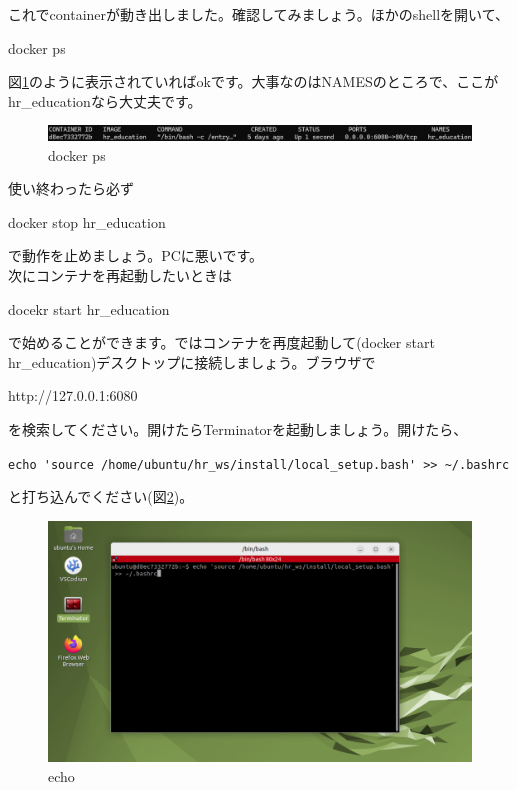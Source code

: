 \documentclass[a4paper,10pt]{jsarticle}
\begin{document}
これでcontainerが動き出しました。確認してみましょう。ほかのshellを開いて、
\begin{center}
  docker ps
\end{center}
図\ref{dockerps}のように表示されていればokです。大事なのはNAMESのところで、ここがhr\_educationなら大丈夫です。
\begin{figure}[ht]
  \begin{center}
    \includegraphics[width=16cm]{pictures/docker_ps.png}
    \caption{docker ps}
    \label{dockerps}
  \end{center}
\end{figure}

使い終わったら必ず
\begin{center}
  docker stop hr\_education
\end{center}
で動作を止めましょう。PCに悪いです。\\
次にコンテナを再起動したいときは
\begin{center}
  docekr start hr\_education
\end{center}
で始めることができます。ではコンテナを再度起動して(docker start hr\_education)デスクトップに接続しましょう。ブラウザで
\begin{center}
  http://127.0.0.1:6080
\end{center}
を検索してください。開けたらTerminatorを起動しましょう。開けたら、
\begin{center}
  \verb|echo 'source /home/ubuntu/hr_ws/install/local_setup.bash' >> ~/.bashrc|
\end{center}
と打ち込んでください(図\ref{echo})。
\begin{figure}[ht]
  \begin{center}
    \includegraphics[width=12cm]{pictures/echo.png}
    \caption{echo}
    \label{echo}
  \end{center}
\end{figure}
\end{document}
